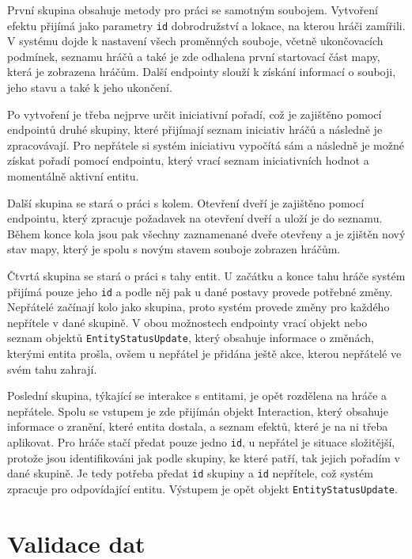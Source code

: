 

První skupina obsahuje metody pro práci se samotným soubojem. Vytvoření efektu přijímá jako parametry \texttt{id} dobrodružství a lokace, na kterou hráči zamířili. V systému dojde k nastavení všech proměnných souboje, včetně ukončovacích podmínek, seznamu hráčů a také je zde odhalena první startovací část mapy, která je zobrazena hráčům. Další endpointy slouží k získání informací o souboji, jeho stavu a také k jeho ukončení.

Po vytvoření je třeba nejprve určit iniciativní pořadí, což je zajištěno pomocí endpointů druhé skupiny, které přijímají seznam iniciativ hráčů a následně je zpracovávají. Pro nepřátele si systém iniciativu vypočítá sám a následně je možné získat pořadí pomocí endpointu, který vrací seznam iniciativních hodnot a momentálně aktivní entitu.

Další skupina se stará o práci s kolem. Otevření dveří je zajištěno pomocí endpointu, který zpracuje požadavek na otevření dveří a uloží je do seznamu. Během konce kola jsou pak všechny zaznamenané dveře otevřeny a je zjištěn nový stav mapy, který je spolu s novým stavem souboje zobrazen hráčům.

Čtvrtá skupina se stará o práci s tahy entit. U začátku a konce tahu hráče systém přijímá pouze jeho \texttt{id} a podle něj pak u dané postavy provede potřebné změny. Nepřátelé začínají kolo jako skupina, proto systém provede změny pro každého nepřítele v dané skupině. V obou možnostech endpointy vrací objekt nebo seznam objektů \texttt{EntityStatusUpdate}, který obsahuje informace o změnách, kterými entita prošla, ovšem u nepřátel je přidána ještě akce, kterou nepřátelé ve svém tahu zahrají.

Poslední skupina, týkající se interakce s entitami, je opět rozdělena na hráče a nepřátele. Spolu se vstupem je zde přijímán objekt Interaction, který obsahuje informace o zranění, které entita dostala, a seznam efektů, které je na ni třeba aplikovat. Pro hráče stačí předat pouze jedno \texttt{id}, u nepřátel je situace složitější, protože jsou identifikováni jak podle skupiny, ke které patří, tak jejich pořadím v dané skupině. Je tedy potřeba předat \texttt{id} skupiny a \texttt{id} nepřítele, což systém zpracuje pro odpovídající entitu. Výstupem je opět objekt \texttt{EntityStatusUpdate}.

\section{Validace dat}
\label{sec:validation}


